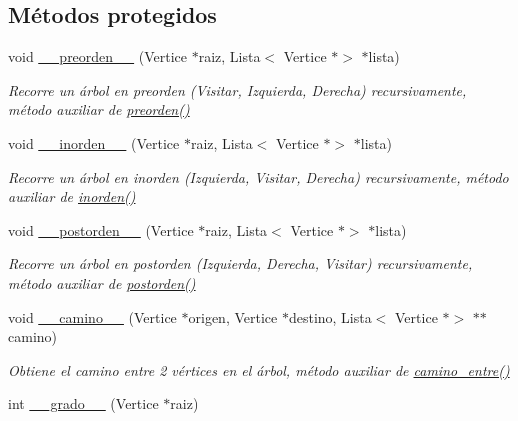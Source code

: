\subsection*{Métodos protegidos}
\begin{DoxyCompactItemize}
\item 
void \hyperlink{classArbol_a707f748c57d51f6b63fe1a605476e49d}{\+\_\+\+\_\+preorden\+\_\+\+\_\+} (Vertice $\ast$raiz, Lista$<$ Vertice $\ast$$>$ $\ast$lista)
\begin{DoxyCompactList}\small\item\em Recorre un árbol en preorden (Visitar, Izquierda, Derecha) recursivamente, método auxiliar de \hyperlink{classArbol_a0ffdc60ce8f2267366681cc94cf6beea}{preorden()} \end{DoxyCompactList}\item 
void \hyperlink{classArbol_ae3dc89f7db1fb9b54bcc2489eb1d9542}{\+\_\+\+\_\+inorden\+\_\+\+\_\+} (Vertice $\ast$raiz, Lista$<$ Vertice $\ast$$>$ $\ast$lista)
\begin{DoxyCompactList}\small\item\em Recorre un árbol en inorden (Izquierda, Visitar, Derecha) recursivamente, método auxiliar de \hyperlink{classArbol_a80a0c3cf2d7f3e92a5c8e5504947dab5}{inorden()} \end{DoxyCompactList}\item 
void \hyperlink{classArbol_aea4cc9147a79d74956413a233df1dbe0}{\+\_\+\+\_\+postorden\+\_\+\+\_\+} (Vertice $\ast$raiz, Lista$<$ Vertice $\ast$$>$ $\ast$lista)
\begin{DoxyCompactList}\small\item\em Recorre un árbol en postorden (Izquierda, Derecha, Visitar) recursivamente, método auxiliar de \hyperlink{classArbol_a126e7d801dbe214ac39f183c26e9135d}{postorden()} \end{DoxyCompactList}\item 
void \hyperlink{classArbol_a1e00baa76d846e9e586e7d179ec51907}{\+\_\+\+\_\+camino\+\_\+\+\_\+} (Vertice $\ast$origen, Vertice $\ast$destino, Lista$<$ Vertice $\ast$$>$ $\ast$$\ast$camino)
\begin{DoxyCompactList}\small\item\em Obtiene el camino entre 2 vértices en el árbol, método auxiliar de \hyperlink{classArbol_accfa606c5f5e67b6ab18c4490075cf39}{camino\+\_\+entre()} \end{DoxyCompactList}\item 
int \hyperlink{classArbol_ad3077ad7b0c57ed7c98baa7fcd8aab47}{\+\_\+\+\_\+grado\+\_\+\+\_\+} (Vertice $\ast$raiz)
$$
\end{DoxyCompactItemize}
